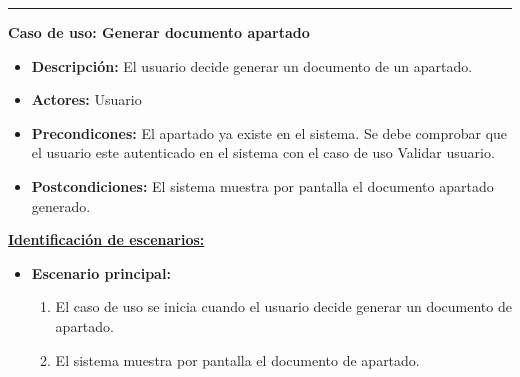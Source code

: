 \smallskip
\hrule height 1pt
\smallskip
\textbf{Caso de uso: Generar documento apartado}
\begin{itemize}\renewcommand{\labelitemi}{$\cdot$}
 \item \textbf{Descripción:} El usuario decide generar un documento de un apartado.
  \item \textbf{Actores:} Usuario
  \item \textbf{Precondicones:} El apartado ya existe en el sistema. Se debe comprobar que el usuario este autenticado en el sistema con el caso de uso Validar usuario.
  \item \textbf{Postcondiciones:} El sistema muestra por pantalla el documento apartado generado.
\end{itemize}
\underline{\textbf{Identificación de escenarios:}}
\begin{itemize}\renewcommand{\labelitemi}{$\circ$}
 \item \textbf{Escenario principal:}
         \begin{enumerate}
          \item El caso de uso se inicia cuando el usuario decide generar un documento de apartado.
	  \item El sistema muestra por pantalla el documento de apartado.
         \end{enumerate}
\end{itemize}

